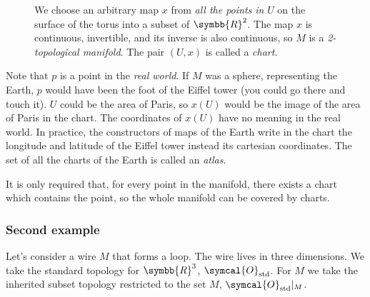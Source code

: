 \begin{figure}[ht]
  \caption{We choose an arbitrary map $x$ from \emph{all the points in} $U$ on the surface of the
    torus into a subset of $\symbb{R}^2$. The map $x$ is continuous, invertible, and its inverse is
    also continuous, so $M$ is a \emph{2-topological manifold}. The pair $(U,x)$ is called a
    \emph{chart}.}
  \label{fig:mf-torus-chart}
\end{figure}

Note that $p$ is a point in the \emph{real world}. If $M$ was a sphere, representing the Earth,
$p$ would have been the foot of the Eiffel tower (you could go there and touch it). $U$ could
be the area of Paris, so $x(U)$ would be the image of the area of Paris in the chart.
The coordinates of $x(U)$ have no meaning in the real world. In practice, the constructors of
maps of the Earth write in the chart the longitude and latitude of the Eiffel tower instead its
cartesian coordinates. The set of all the charts of the Earth is called an
\emph{atlas}\footnotemark{}. 

It is only required that, for every point in the manifold, there exists a chart which contains
the point, so the whole manifold can be covered by charts.

\subsubsection{Second example}
Let's consider a wire $M$ that forms a loop. The wire lives in three dimensions. We take the
standard topology for $\symbb{R}^3$, $\symcal{O}_{\text{std}}$.
For $M$ we take the inherited subset topology restricted to the set $M$,
$\symcal{O}_{\text{std}}|_M$.

